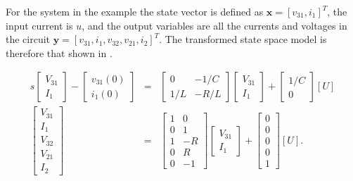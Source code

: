 For the system in the example the state vector is defined as
$\mathbf{x}=[v_{31}, i_1]^{T}$, the input current is $u$, and the output
variables are all the currents and voltages in the circuit
$\mathbf{y}=[v_{31}, i_1, v_{32}, v_{21}, i_2]^{T}$. The transformed
state space model is therefore that shown in
.
\begin{slide}\label{slide:slide-l2eg1}
\begin{eqnarray*} s\left[\begin{array}{c}
  V_{31} \\
  I_1
\end{array}\right]-\left[\begin{array}{c}
  v_{31}(0) \\
  i_1(0)
\end{array}\right]&=&\left[\begin{array}{cc}
  0 & -1/C \\
  1/L & -R/L
\end{array}\right]\left[\begin{array}{c}
  V_{31} \\
  I_1
\end{array}\right]+\left[\begin{array}{c}
  1/C \\
  0
\end{array}\right]\left[U\right]\\
\left[\begin{array}{c}
  V_{31} \\
  I_1 \\
  V_{32} \\
  V_{21} \\
  I_{2}
\end{array}\right]&=&\left[\begin{array}{cc}
  1 & 0 \\
  0 & 1 \\
  1 & -R \\
  0 & R \\
  0 & -1
\end{array}\right]\left[\begin{array}{c}
  V_{31} \\
  I_1
\end{array}\right]+\left[\begin{array}{c}
  0 \\
  0 \\
  0 \\
  0 \\
  1
\end{array}\right]\left[U\right].
\end{eqnarray*}
\end{slide}

